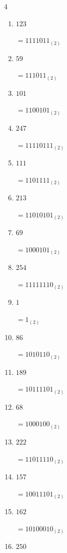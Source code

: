 \begin{multicols}{4}
\begin{enumerate}
        $=11001001_{(2)}$

  \item $123$

        $=1111011_{(2)}$

  \item $59$

        $=111011_{(2)}$

\columnbreak %

  \item $101$

        $=1100101_{(2)}$

  \item $247$

        $=11110111_{(2)}$

  \item $111$

        $=1101111_{(2)}$

  \item $213$

        $=11010101_{(2)}$

  \item $69$

        $=1000101_{(2)}$

  \item $254$

        $=11111110_{(2)}$

  \item $1$

        $=1_{(2)}$

  \item $86$

        $=1010110_{(2)}$

  \item $189$

        $=10111101_{(2)}$

  \item $68$

        $=1000100_{(2)}$

  \item $222$

        $=11011110_{(2)}$

  \item $157$

        $=10011101_{(2)}$

  \item $162$

        $=10100010_{(2)}$

  \item $250$


\end{enumerate}
\end{multicols}
